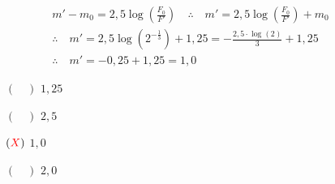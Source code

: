 \documentclass[a4paper, 12pt]{article}
\newcommand{\red}[1]{\textcolor{red}{#1}}
\begin{document}
\begin{flushleft}
\begin{itemize}
\begin{itemize}
{\begin{itemize}
                                \begin{equation*} \begin{gathered}
                                    m'-m_0=2,5 \log \left(\frac{F_0}{F'}\right) \quad \therefore \quad m'=2,5 \log \left(\frac{F_0}{F'}\right)+m_0\\
                                    \therefore \quad m'=2,5 \log \left(2^{-\frac{1}{3}}\right)+1,25=-\frac{2,5 \cdot \log (2)}{3}+1,25\\
                                    \therefore \quad m'=-0,25 +1,25 =1,0
                                \end{gathered} \end{equation*}
                        \end{itemize}}
                        \begin{itemize}
                            \item[$(\quad)$] $1,25$
                            \item[$(\quad)$] $2,5$
                            \item[$(\red{X})$] $1,0$
                            \item[$(\quad)$] $2,0$
                        \end{itemize}
                \end{itemize}
        \end{itemize} \end{flushleft}
\end{document}
